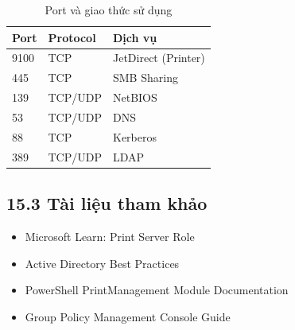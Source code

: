 \begin{table}[h]
\centering
\begin{tabular}{|l|l|p{6cm}|}
\hline
\textbf{Port} & \textbf{Protocol} & \textbf{Dịch vụ} \\
\hline
9100 & TCP & JetDirect (Printer) \\
\hline
445 & TCP & SMB Sharing \\
\hline
139 & TCP/UDP & NetBIOS \\
\hline
53 & TCP/UDP & DNS \\
\hline
88 & TCP & Kerberos \\
\hline
389 & TCP/UDP & LDAP \\
\hline
\end{tabular}
\caption{Port và giao thức sử dụng}
\end{table}

\subsection*{15.3 Tài liệu tham khảo}

\begin{itemize}
    \item Microsoft Learn: Print Server Role
    \item Active Directory Best Practices
    \item PowerShell PrintManagement Module Documentation
    \item Group Policy Management Console Guide
\end{itemize}

